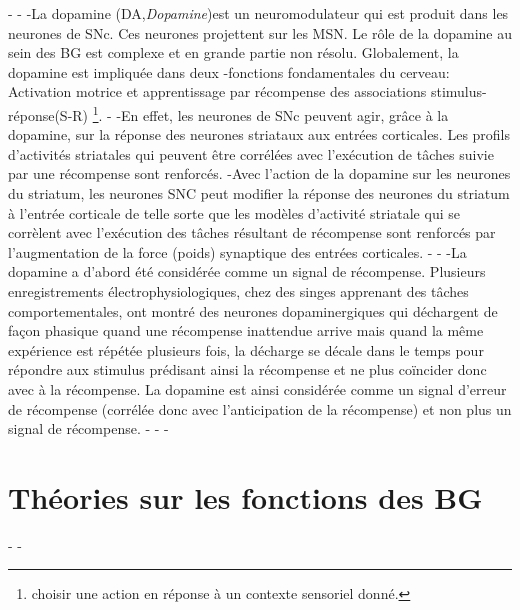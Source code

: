 -
-
-La dopamine (DA,\textit{Dopamine})est un neuromodulateur qui est produit dans les neurones de SNc. Ces neurones projettent sur les MSN.  Le rôle de la dopamine au sein des BG est complexe et en grande partie non résolu. Globalement, la dopamine est impliquée dans deux
-fonctions fondamentales du cerveau: Activation motrice et apprentissage par récompense des associations stimulus-réponse(S-R) \footnote{choisir une action en réponse à un contexte sensoriel donné.}.
-
-En effet, les neurones de SNc peuvent agir, grâce à la dopamine, sur la réponse des neurones striataux aux entrées corticales. Les profils d'activités striatales qui peuvent être corrélées avec l'exécution de tâches suivie par une récompense sont renforcés.  
-Avec l'action de la dopamine sur les neurones du striatum, les neurones SNC peut modifier la réponse des neurones du striatum à l'entrée corticale de telle sorte que les modèles d'activité striatale qui se corrèlent avec l'exécution des tâches résultant de récompense sont renforcés par l'augmentation de la force (poids) synaptique des entrées corticales.
-
-
-La dopamine a d'abord été considérée comme un signal de récompense. Plusieurs enregistrements électrophysiologiques, chez des singes apprenant des tâches comportementales, ont montré des neurones dopaminergiques qui déchargent de façon phasique quand une récompense inattendue arrive mais quand la même expérience est répétée plusieurs fois, la décharge se décale dans le temps pour répondre aux stimulus prédisant ainsi la récompense et ne plus coïncider donc avec à la récompense. La dopamine est ainsi considérée comme un signal d'erreur de récompense (corrélée donc avec l'anticipation de la récompense) et non plus un signal de récompense\citep{Houk:1995, Schultz:1997, Hollerman:1998}.
-%
-
-\section{Théories sur les fonctions des BG}
-
-%
